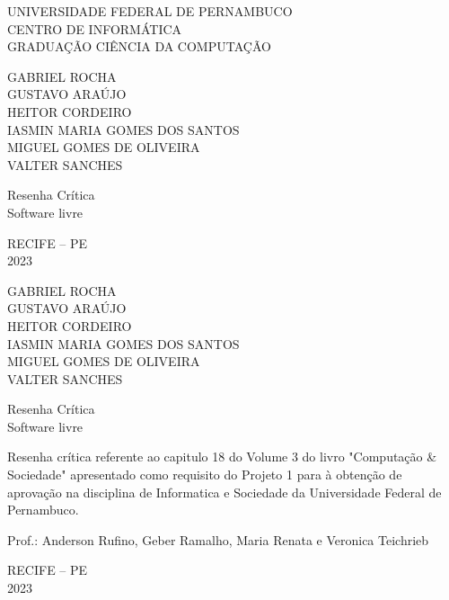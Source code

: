 \documentclass[a4paper, 12pt]{article}
\begin{document}
\thispagestyle{empty}

\begin{center}
    UNIVERSIDADE FEDERAL DE PERNAMBUCO \\
    CENTRO DE INFORMÁTICA \\
    GRADUAÇÃO CIÊNCIA DA COMPUTAÇÃO

    \vspace{3cm}

    GABRIEL ROCHA \\
    GUSTAVO ARAÚJO  \\
    HEITOR CORDEIRO \\
    IASMIN MARIA GOMES DOS SANTOS \\
    MIGUEL GOMES DE OLIVEIRA\\
    VALTER SANCHES 

    \vspace{4cm}

    Resenha Crítica \\
    Software livre

    
    \vfill

    RECIFE -- PE \\
    2023
\end{center}

\newpage
\thispagestyle{empty}
\begin{center}
    GABRIEL ROCHA \\
    GUSTAVO ARAÚJO  \\
    HEITOR CORDEIRO \\
    IASMIN MARIA GOMES DOS SANTOS \\
    MIGUEL GOMES DE OLIVEIRA\\
    VALTER SANCHES 

    \vspace{6cm}

    Resenha Crítica\\
    Software livre

    \vspace{2cm}

    \hspace*{0.5\textwidth} %
    \begin{minipage}{0.5\textwidth} %
        \justifying %
        Resenha crítica referente ao capitulo 18 do Volume 3 do livro "Computação \& Sociedade"  apresentado como requisito do Projeto 1 para à obtenção de aprovação na disciplina de Informatica e Sociedade da Universidade Federal de Pernambuco.

        \vspace{1\baselineskip}
        Prof.: Anderson Rufino, Geber Ramalho, Maria Renata e Veronica Teichrieb
    \end{minipage}

    \vfill

    RECIFE -- PE \\
    2023
\end{center}
\end{document}

